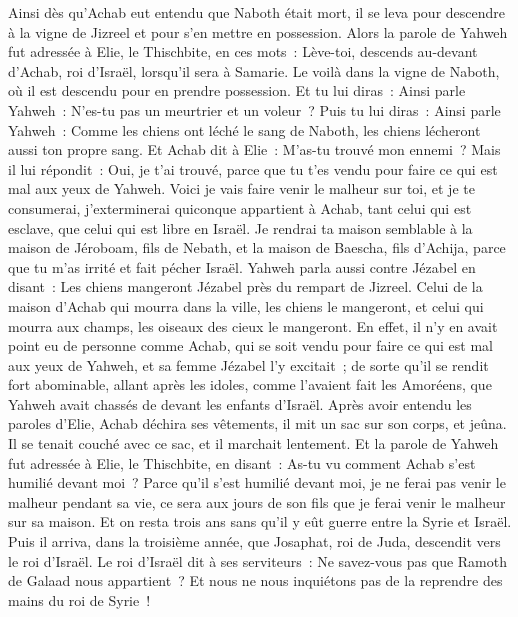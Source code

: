 \begin{multicols}{2}
Ainsi dès qu'Achab eut entendu que Naboth était mort, il se leva pour descendre à la vigne de Jizreel et pour s'en mettre en possession.
Alors la parole de Yahweh fut adressée à Elie, le Thischbite, en ces mots~:
Lève-toi, descends au-devant d'Achab, roi d'Israël, lorsqu'il sera à Samarie. Le voilà dans la vigne de Naboth, où il est descendu pour en prendre possession.
Et tu lui diras~: Ainsi parle Yahweh~: N'es-tu pas un meurtrier et un voleur~? Puis tu lui diras~: Ainsi parle Yahweh~: Comme les chiens ont léché le sang de Naboth, les chiens lécheront aussi ton propre sang.
Et Achab dit à Elie~: M'as-tu trouvé mon ennemi~? Mais il lui répondit~: Oui, je t'ai trouvé, parce que tu t'es vendu pour faire ce qui est mal aux yeux de Yahweh.
Voici je vais faire venir le malheur sur toi, et je te consumerai, j'exterminerai quiconque appartient à Achab, tant celui qui est esclave, que celui qui est libre en Israël.
Je rendrai ta maison semblable à la maison de Jéroboam, fils de Nebath, et la maison de Baescha, fils d'Achija, parce que tu m'as irrité et fait pécher Israël.
Yahweh parla aussi contre Jézabel en disant~: Les chiens mangeront Jézabel près du rempart de Jizreel.
Celui de la maison d'Achab qui mourra dans la ville, les chiens le mangeront, et celui qui mourra aux champs, les oiseaux des cieux le mangeront.
En effet, il n'y en avait point eu de personne comme Achab, qui se soit vendu pour faire ce qui est mal aux yeux de Yahweh, et sa femme Jézabel l'y excitait~;
de sorte qu'il se rendit fort abominable, allant après les idoles, comme l'avaient fait les Amoréens, que Yahweh avait chassés de devant les enfants d'Israël.
Après avoir entendu les paroles d'Elie, Achab déchira ses vêtements, il mit un sac sur son corps, et jeûna. Il se tenait couché avec ce sac, et il marchait lentement.
Et la parole de Yahweh fut adressée à Elie, le Thischbite, en disant~:
As-tu vu comment Achab s'est humilié devant moi~? Parce qu'il s'est humilié devant moi, je ne ferai pas venir le malheur pendant sa vie, ce sera aux jours de son fils que je ferai venir le malheur sur sa maison.
\VerseOne{}Et on resta trois ans sans qu'il y eût guerre entre la Syrie et Israël.
Puis il arriva, dans la troisième année, que Josaphat, roi de Juda, descendit vers le roi d'Israël.
Le roi d'Israël dit à ses serviteurs~: Ne savez-vous pas que Ramoth de Galaad nous appartient~? Et nous ne nous inquiétons pas de la reprendre des mains du roi de Syrie~!

\end{multicols}

